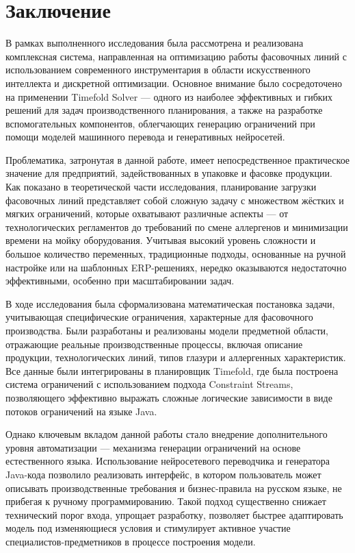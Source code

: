 \chapter*{Заключение}

В рамках выполненного исследования была рассмотрена и реализована комплексная система, направленная на оптимизацию работы фасовочных линий с использованием современного инструментария в области искусственного интеллекта и дискретной оптимизации. Основное внимание было сосредоточено на применении Timefold Solver — одного из наиболее эффективных и гибких решений для задач производственного планирования, а также на разработке вспомогательных компонентов, облегчающих генерацию ограничений при помощи моделей машинного перевода и генеративных нейросетей.

Проблематика, затронутая в данной работе, имеет непосредственное практическое значение для предприятий, задействованных в упаковке и фасовке продукции. Как показано в теоретической части исследования, планирование загрузки фасовочных линий представляет собой сложную задачу с множеством жёстких и мягких ограничений, которые охватывают различные аспекты — от технологических регламентов до требований по смене аллергенов и минимизации времени на мойку оборудования. Учитывая высокий уровень сложности и большое количество переменных, традиционные подходы, основанные на ручной настройке или на шаблонных ERP-решениях, нередко оказываются недостаточно эффективными, особенно при масштабировании задач.

В ходе исследования была сформализована математическая постановка задачи, учитывающая специфические ограничения, характерные для фасовочного производства. Были разработаны и реализованы модели предметной области, отражающие реальные производственные процессы, включая описание продукции, технологических линий, типов глазури и аллергенных характеристик. Все данные были интегрированы в планировщик Timefold, где была построена система ограничений с использованием подхода Constraint Streams, позволяющего эффективно выражать сложные логические зависимости в виде потоков ограничений на языке Java.

Однако ключевым вкладом данной работы стало внедрение дополнительного уровня автоматизации — механизма генерации ограничений на основе естественного языка. Использование нейросетевого переводчика и генератора Java-кода позволило реализовать интерфейс, в котором пользователь может описывать производственные требования и бизнес-правила на русском языке, не прибегая к ручному программированию. Такой подход существенно снижает технический порог входа, упрощает разработку, позволяет быстрее адаптировать модель под изменяющиеся условия и стимулирует активное участие специалистов-предметников в процессе построения модели.

